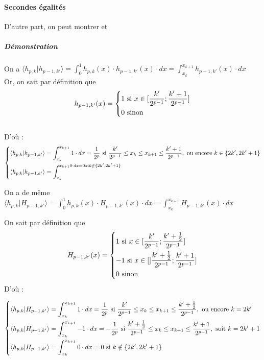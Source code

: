 \documentclass{article}
\begin{document}
\paragraph{Secondes égalités}

D'autre part, on peut montrer  et  \\


\subparagraph*{Démonstration} 

On a $\displaystyle \langle{}h_{p,k}|h_{p-1,k'}\rangle = \int_0^1 h_{p,k}(x)\cdot{}h_{p-1,k'}(x)\cdot{}dx = \int_{x_k}^{x_{k+1}}h_{p-1,k'}(x)\cdot{}dx$ \\

Or, on sait par définition que \[ h_{p-1,k'}(x)= \begin{dcases} 1 \text{ si }x \in [\frac{k'}{2^{p-1}};\frac{k'+1}{2^{p-1}} ] \\
0 \text{ sinon } \end{dcases} \]\\
D'où :
\[ \begin{dcases}
\langle{}h_{p,k}|h_{p-1,k'}\rangle = \int_{x_k}^{x_{k+1}}1\cdot{}dx
= \frac{1}{2^p} \text{ si } \frac{k'}{2^{p-1}} \leq x_k \leq x_{k+1} \leq \frac{k'+1}{2^{p-1}}, \text{ ou encore } k \in \{2k',2k'+1\}\\ 
\langle{}h_{p,k}|h_{p-1,k'}\rangle = \int_{x_k}^{x_{k+1}0\cdot{}dx = 0 si k \notin \{2k',2k'+1\}}
\end{dcases} \]

On a de même \\
 $\displaystyle \langle{}h_{p,k}|H_{p-1,k'}\rangle = \int_0^{1}h_{p,k}(x)\cdot{}H_{p-1,k'}(x)\cdot{}dx = \int_{x_k}^{x_{k+1}}H_{p-1,k'}(x)\cdot{}dx$

On sait par définition que \[ H_{p-1,k'}(x) = \begin{dcases} 
1 \text{ si } x \in [\frac{k'}{2^{p-1}};\frac{k'+\frac{1}{2}}{2^{p-1}} ] \\
-1 \text{ si } x \in []\frac{k'+\frac{1}{2}}{2^{p-1}};\frac{k'+1}{2^{p-1}} ] \\
0 \text{ sinon }
\end{dcases}
\] D'où :

\[ \begin{dcases}
\langle{}h_{p,k}|H_{p-1,k'}\rangle = \int_{x_k}^{x_{k+1}}1\cdot{}dx = \frac{1}{2^p} \text{ si } \frac{k'}{2^{p-1}} \leq x_k \leq x_{k+1} \leq \frac{k'+\frac{1}{2}}{2^{p-1}}, \text{ ou encore } k = 2k' \\
\langle{}h_{p,k}|H_{p-1,k'}\rangle = \int_{x_k}^{x_{k+1}}-1\cdot{}dx = -\frac{1}{2^p} \text{ si } \frac{k'+\frac{1}{2}}{2^{p-1}} \leq x_k \leq x_{k+1} \leq \frac{k'+1}{2^{p-1}}, \text{ soit } k = 2k'+1 \\
\langle{}h_{p,k}|H_{p-1,k'}\rangle = \int_{x_k}^{x_{k+1}}0\cdot{}dx = 0 \text{ si } k \notin \{2k',2k'+1\}
\end{dcases}
\]
\end{document}
